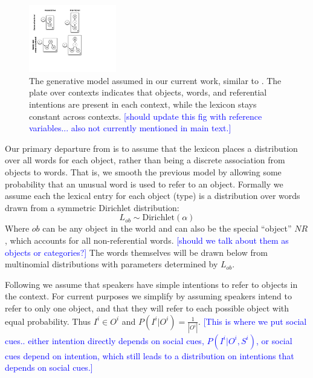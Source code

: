 \documentclass[man,noapacite,12pt]{apa2}
\newcommand{\nnote}[1]{\textcolor{blue}{[#1]}}
\begin{document}
\begin{figure}[tr]
\begin{center}
\includegraphics[width=1.5in]{figures/gen_mod.pdf}
\caption{\label{fig:genmod} The generative model assumed in our current work, similar to \protect{}. The plate over contexts indicates that objects, words, and referential intentions are present in each context, while the lexicon stays constant across contexts. \nnote{should update this fig with reference variables... also not currently mentioned in main text.}}
\end{center}
\end{figure}

Our primary departure from \cite{frank2009} is to assume that the lexicon places a distribution over all words for each object, rather than being a discrete association from objects to words. That is, we smooth the previous model by allowing some probability that an unusual word is used to refer to an object. Formally we assume each the lexical entry for each object (type) is a distribution over words drawn from a symmetric Dirichlet distribution:
\begin{equation}
\label{eqn:lexprior}
L_{ob} \sim \text{Dirichlet}(\alpha)
\end{equation}
Where $ob$ can be any object in the world and can also be the special ``object'' $NR$, which accounts for all non-referential words. \nnote{should we talk about them as objects or categories?}
The words themselves will be drawn below from multinomial distributions with parameters determined by $L_{ob}$.

Following \cite{frank2009} we assume that speakers have simple intentions to refer to objects in the context. For current purposes we simplify by assuming speakers intend to refer to only one object, and that they will refer to each possible object with equal probability. Thus $I^{i} \in O^{i}$ and
$P(I^{i}| O^{i}) = \frac{1}{|O^{i}|}$.
\nnote{This is where we put social cues.. either intention directly depends on social cues, $P(I^{i}| O^{i},S^{i})$, or social cues depend on intention, which still leads to a distribution on intentions that depends on social cues.}
\end{document}
